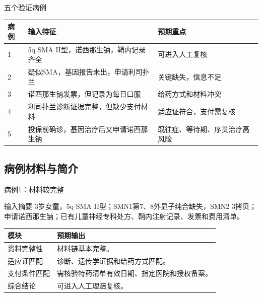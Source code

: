 \documentclass{beamer}
\begin{document}
\begin{frame}[fragile]{五个验证病例}
  \begin{tabularx}{\textwidth}{l X X}
    \toprule
    病例 & 输入特征 & 预期重点 \\
    \midrule
    1 & 5q SMA II型，诺西那生钠，鞘内记录齐全 & 可进入人工复核 \\
    2 & 疑似SMA，基因报告未出，申请利司扑兰 & 关键缺失，信息不足 \\
    3 & 诺西那生钠发票，但记录为每日口服 & 给药方式和材料冲突 \\
    4 & 利司扑兰诊断证据完整，但缺少支付材料 & 适应证符合，支付需复核 \\
    5 & 投保前确诊，基因治疗后又申请诺西那生钠 & 既往症、等待期、序贯治疗高风险 \\
    \bottomrule
  \end{tabularx}
\end{frame}

\subsection{病例材料与简介}
\begin{frame}[fragile]{病例1：材料较完整}
  \begin{block}{输入摘要}
    3岁女童，5q SMA II型；SMN1第7、8外显子纯合缺失，SMN2 3拷贝；申请诺西那生钠；已有儿童神经专科处方、鞘内注射记录、发票和费用清单。\cite{RN65}
  \end{block}
  \begin{tabularx}{\textwidth}{l X}
    \toprule
    模块 & 预期输出 \\
    \midrule
    资料完整性 & 材料链基本完整。 \\
    适应证匹配 & 诊断、遗传学证据和给药方式匹配。 \\
    支付条件匹配 & 需核验特药清单有效日期、指定医院和授权备案。 \\
    综合结论 & 可进入人工理赔复核。 \\
    \bottomrule
  \end{tabularx}
\end{frame}
\end{document}
